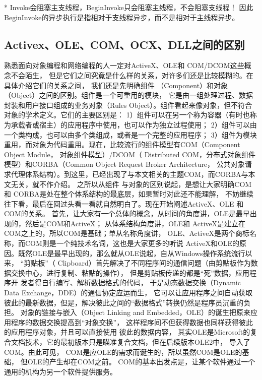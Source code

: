 \documentclass{book}
\begin{document}
* Invoke会阻塞主支线程，BeginInvoke只会阻塞主线程，不会阻塞支线程！
因此BeginInvoke的异步执行是指相对于支线程异步，而不是相对于主线程异步。

\subsection{Activex、OLE、COM、OCX、DLL之间的区别}

熟悉面向对象编程和网络编程的人一定对ActiveX、OLE和 COM/DCOM这些概念不会陌生，
但是它们之间究竟是什么样的关系，对许多们还是比较模糊的。在具体介绍它们的关系之间，
我们还是先明确组件 （Component）和对象（Object）之间的区别。组件是一个可重用的模块，
它是由一组处理过程、数据封装和用户接口组成的业务对象（Rules Object）。组件看起来像对象，但不符合对象的学术定义。它们的主要区别是： 
1）组件可以在另一个称为容器（有时也称为承载者或宿主）的应用程序中使用，也可以作为独立过程使用； 
2）组件可以由一个类构成，也可以由多个类组成，或者是一个完整的应用程序； 
3）组件为模块重用，而对象为代码重用。现在，比较流行的组件模型有COM（Component Object Module，
对象组件模型）/DCOM（ Distributed COM，分布式对象组件模型）和CORBA（Common Object Request Broker Architecture，
公共对象请求代理体系结构）。到这里，已经出现了与本文相关的主题COM，而CORBA与本文无关，就不作介绍。
之所以从组件 与对象的区别说起，是想让大家明确COM和 CORBA是处在整个体系结构的最底层，如果暂时对此还不能理解，
不妨继续往下看，最后在回过头看一看就自然明白了。现在开始阐述ActiveX、OLE 和COM的关系。
首先，让大家有一个总体的概念，从时间的角度讲，OLE是最早出现的，然后是COM和ActiveX；
从体系结构角度讲，OLE和 ActiveX是建立在 COM之上的，所以COM是基础；单从名称角度讲，
OLE、ActiveX是两个商标名称，而COM则是一个纯技术名词，这也是大家更多的听说 ActiveX和OLE的原因。既然OLE是最早出现的，那么就从OLE说起，自从Windows操作系统流行以来，
“剪贴板”（ Clipboard）首先解决了不同程序间的通信问题（由剪贴板作为数据交换中心，进行复制、粘贴的操作），
但是剪贴板传递的都是“死”数据，应用程序开 发者得自行编写、解析数据格式的代码，
于是动态数据交换（Dynamic Data Exchange，DDE）的通信协定应运而生，
它可以让应用程序之间自动获取彼此的最新数据，但是，解决彼此之间的“数据格式”转换仍然是程序员沉重的负担。
对象的链接与嵌入（Object Linking and Embedded，OLE）的诞生把原来应用程序的数据交换提高到“对象交换”，
这样程序间不但获得数据也同样获得彼此的应用程序对象，并且可以直接使用 彼此的数据内容，
其实OLE是Microsoft的复合文档技术，它的最初版本只是瞄准复合文档，但在后续版本OLE2中，
导入了COM。由此可见， COM是应OLE的需求而诞生的，所以虽然COM是OLE的基础，
但OLE的产生却在COM之前。 COM的基本出发点是，让某个软件通过一个通用的机构为另一个软件提供服务。
\end{document}
